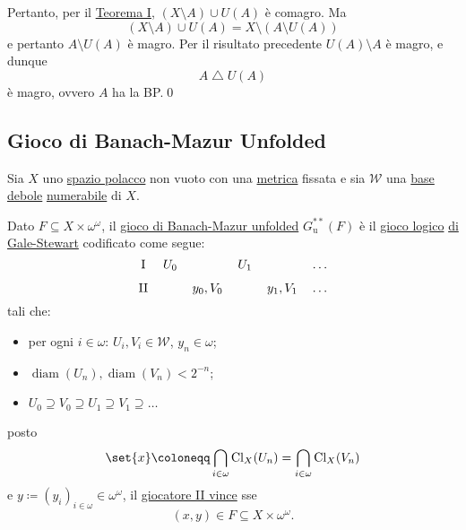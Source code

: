 \documentclass{article}
\newcommand{\1}{\mathds{1}}
\begin{document}
Pertanto, per il \href{../../../../../../../org/roam/20250514174717-teorema_di_caratterizzazione_dei_comagri_tramite_il_gioco_di_banach_mazur.org}{Teorema I}, \((X\setminus A)\cup U(A)\) è comagro. Ma
\begin{equation*}
(X\setminus A)\cup U(A) = X \setminus\left(A\setminus U(A)\right)
\end{equation*}
e pertanto \(A\setminus U(A)\) è magro. Per il risultato precedente \(U(A)\setminus A\) è magro, e dunque
\begin{equation*}
A\mathrel{\triangle}U(A)
\end{equation*}
è magro, ovvero \(A\) ha la BP.\qed
\subsection{Gioco di Banach-Mazur Unfolded}
\label{sec:org8e1057c}
Sia \(X\) uno \href{../../../../../../../org/roam/20250301194013-spazio_polacco.org}{spazio polacco} non vuoto con una \href{../../../../../../../org/roam/20250301193511-spazio_metrico.org}{metrica} fissata e sia \(\mathcal{W}\) una \href{../../../../../../../org/roam/20250525113346-base_debole_di_uno_spazio_topologico.org}{base debole} \href{../../../../../../../org/roam/20250111143651-insieme_numerabile.org}{numerabile} di \(X\).

Dato \(F \subseteq X\times \omega^{\omega}\), il \uline{gioco di Banach-Mazur unfolded} \(G^{**}_{\text{u}}(F)\) è il \href{../../../../../../../org/roam/20250513155732-logic_game.org}{gioco logico} \hyperref[sec:org21a45cb]{di Gale-Stewart} codificato come segue:
\begin{equation*}
\begin{tikzcd}[ampersand replacement=\&,cramped,sep=tiny]
	{\text{I}} \& {U_0} \&\& {U_1} \&\& \dots \\
	{\text{II}} \&\& {y_0,V_0} \&\& {y_1, V_{1}} \& \dots
\end{tikzcd}
\end{equation*}
tali che:
\begin{itemize}
\item per ogni \(i \in \omega\): \(U_{i}, V_{i} \in \mathcal{W}\), \(y_{n} \in \omega\);
\item \(\operatorname{diam}(U_{n}), \operatorname{diam}(V_{n}) < 2^{-n}\);
\item \(U_{0}\supseteq V_{0}\supseteq U_{1}\supseteq V_{1}\supseteq \dots\)
\end{itemize}

posto
\begin{equation*}
\set{x}\coloneqq\bigcap_{i \in \omega} \operatorname{Cl}_{X}(U_{n}) = \bigcap_{i \in \omega} \operatorname{Cl}_{X}(V_{n})
\end{equation*}
e \(y\coloneqq (y_{i})_{i \in \omega} \in \omega^{\omega}\), il \uline{giocatore II vince} sse
\begin{equation*}
(x,y) \in F \subseteq X\times \omega^{\omega}.
\end{equation*}
\end{document}
